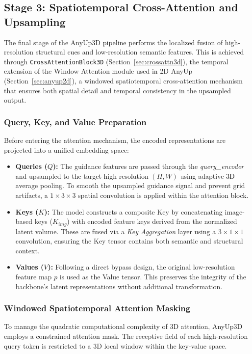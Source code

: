 \subsection{Stage 3: Spatiotemporal Cross-Attention and Upsampling}

The final stage of the AnyUp3D pipeline performs the localized fusion of high-resolution structural cues and low-resolution semantic features. This is achieved through \texttt{CrossAttentionBlock3D} (Section~\ref{sec:crossattn3d}), the temporal extension of the Window Attention module used in 2D AnyUp (Section~\ref{sec:anyup2d}), a windowed spatiotemporal cross-attention mechanism that ensures both spatial detail and temporal consistency in the upsampled output.

\subsubsection{Query, Key, and Value Preparation}
Before entering the attention mechanism, the encoded representations are projected into a unified embedding space:
\begin{itemize}
    \item \textbf{Queries ($Q$):} The guidance features are passed through the \textit{query\_encoder} and upsampled to the target high-resolution $(H, W)$ using adaptive 3D average pooling. To smooth the upsampled guidance signal and prevent grid artifacts, a $1 \times 3 \times 3$ spatial convolution is applied within the attention block.
    \item \textbf{Keys ($K$):} The model constructs a composite Key by concatenating image-based keys ($K_{img}$) with encoded feature keys derived from the normalized latent volume. These are fused via a \textit{Key Aggregation} layer using a $3 \times 1 \times 1$ convolution, ensuring the Key tensor contains both semantic and structural context.
    \item \textbf{Values ($V$):} Following a direct bypass design, the original low-resolution feature map $p$ is used as the Value tensor. This preserves the integrity of the backbone's latent representations without additional transformation.
\end{itemize}

\subsubsection{Windowed Spatiotemporal Attention Masking}
To manage the quadratic computational complexity of 3D attention, AnyUp3D employs a constrained attention mask. The receptive field of each high-resolution query token is restricted to a 3D local window within the key-value space.

